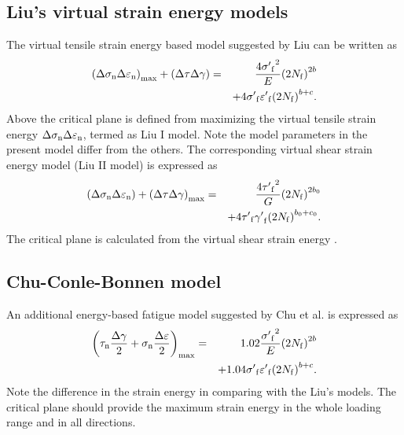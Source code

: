 \documentclass[preprint,5p,twocolumn,10pt,sort&compress]{elsarticle}
\begin{document}
\subsection{Liu's virtual strain energy models}
The virtual tensile strain energy based model suggested by Liu \cite{Liu1993} can be written as
\begin{eqnarray*}
{\left( {\Delta {\sigma _{\rm n}}\Delta {\varepsilon _{\rm n}}} \right)_{\max }} + \left( {\Delta \tau \Delta \gamma } \right) &=& \frac{{4{{\sigma '}_{\rm f}}^2}}{E}{\left( {2{N_{\rm f}}} \right)^{2b}}
\\
& & + 4{{\sigma '}_{\rm f}}{{\varepsilon '}_{\rm f}}{\left( {2{N_{\rm f}}} \right)^{b + c}}.
\end{eqnarray*}
Above the critical plane is defined from maximizing the virtual tensile strain energy ${\Delta {\sigma _{\rm n}}\Delta {\varepsilon _{\rm n}}}$, termed as Liu I model. Note the model parameters in the present model differ from the others. The corresponding virtual shear strain energy model (Liu II model) is expressed as
\begin{eqnarray*}
\left( {\Delta {\sigma _{\rm n}}\Delta {\varepsilon _{\rm n}}} \right) + {\left( {\Delta \tau \Delta \gamma } \right)_{\max }} &=& \frac{{4{{\tau '}_{\rm f}}^2}}{G}{\left( {2{N_{\rm f}}} \right)^{2b_0 }}
\\
&& + 4{{\tau '}_{\rm f}}{{\gamma '}_{\rm f}}{\left( {2{N_{\rm f}}} \right)^{b_0  + c_0 }}.
\end{eqnarray*}
The critical plane is calculated from the virtual shear strain energy \cite{Liu1993}.

\subsection{Chu-Conle-Bonnen model}
An additional energy-based fatigue model suggested by Chu et al. \cite{Chu1993} is expressed as
\begin{eqnarray*}
{\left( {{\tau _{\rm n}}\frac{{\Delta \gamma }}{2} + {\sigma _{\rm n }}\frac{{\Delta \varepsilon }}{2}} \right)_{\max }} &=& 1.02\frac{{{{\sigma '}_{\rm f}}^2}}{E}{\left( {2{N_{\rm f}}} \right)^{2b}} \\
&& + 1.04{{\sigma '}_{\rm f}}{{\varepsilon '}_{\rm f}}{\left( {2{N_{\rm f}}} \right)^{b + c}}.
\end{eqnarray*}
Note the difference in the strain energy in comparing with the Liu's models. The critical plane should provide the maximum strain energy in the whole loading range and in all directions.
\end{document}
